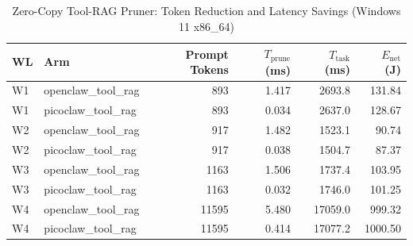 \begin{table}[t]
\centering\small
\caption{Zero-Copy Tool-RAG Pruner: Token Reduction and Latency Savings (Windows 11 x86_64)}
\label{tab:Windows_tool_rag}
\begin{tabular}{llrrrr}
\toprule
WL & Arm & Prompt Tokens & $T_{\text{prune}}$ (ms) & $T_{\text{task}}$ (ms) & $E_{\text{net}}$ (J) \\
\midrule
W1 & openclaw\_tool\_rag & 893 & 1.417 & 2693.8 & 131.84 \\
W1 & picoclaw\_tool\_rag & 893 & 0.034 & 2637.0 & 128.67 \\
W2 & openclaw\_tool\_rag & 917 & 1.482 & 1523.1 & 90.74 \\
W2 & picoclaw\_tool\_rag & 917 & 0.038 & 1504.7 & 87.37 \\
W3 & openclaw\_tool\_rag & 1163 & 1.506 & 1737.4 & 103.95 \\
W3 & picoclaw\_tool\_rag & 1163 & 0.032 & 1746.0 & 101.25 \\
W4 & openclaw\_tool\_rag & 11595 & 5.480 & 17059.0 & 999.32 \\
W4 & picoclaw\_tool\_rag & 11595 & 0.414 & 17077.2 & 1000.50 \\
\bottomrule
\end{tabular}
\end{table}
